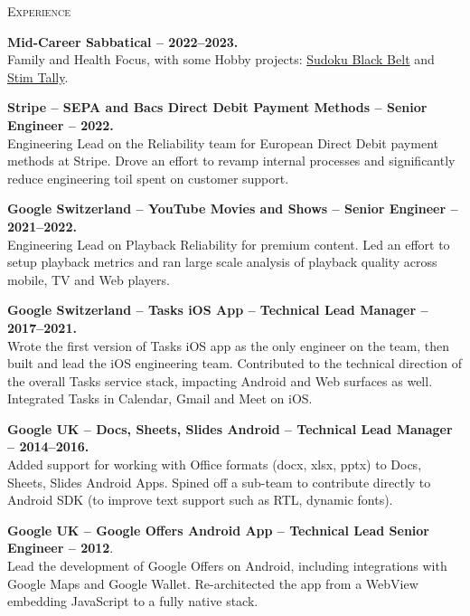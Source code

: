 \documentclass[11pt]{article}
\begin{document}
\vspace{0.12in}
\noindent
\textcolor{Primary}{{\large \textsc{Experience}}}
\begin{list}{}{\leftmargin=0em}

\item
{\bf Mid-Career Sabbatical -- 2022--2023.}\\
Family and Health Focus, with some Hobby projects: \href{https://apps.apple.com/us/app/sudoku-black-belt/id1639802667}{Sudoku Black Belt} and 
\href{https://apps.apple.com/us/app/stim-tally/id6444342899}{Stim Tally}.

\item
{\bf Stripe -- SEPA and Bacs Direct Debit Payment Methods -- Senior Engineer -- 2022.}\\
Engineering Lead on the Reliability team for European Direct Debit payment methods at Stripe.
Drove an effort to revamp internal processes and significantly reduce engineering toil spent on customer support.
  
\item
{\bf Google Switzerland -- YouTube Movies and Shows -- Senior Engineer -- 2021--2022.}\\
Engineering Lead on Playback Reliability for premium content. Led an effort to setup playback metrics and ran large scale analysis of playback quality across mobile, TV and Web players.

\item
{\bf Google Switzerland -- Tasks iOS App -- Technical Lead Manager -- 2017--2021.}\\
Wrote the first version of Tasks iOS app as the only engineer on the team, then built and lead the iOS engineering team.
Contributed to the technical direction of the overall Tasks service stack, impacting Android and Web surfaces
as well. Integrated Tasks in Calendar, Gmail and Meet on iOS.
  
\item
{\bf Google UK -- Docs, Sheets, Slides Android -- Technical Lead Manager -- 2014--2016.}\\
Added support for working with Office formats (docx, xlsx, pptx) to Docs, Sheets, Slides Android Apps. Spined off a
sub-team to contribute directly to Android SDK (to improve text support such as RTL, dynamic fonts). 

\item
{\bf Google UK -- Google Offers Android App -- Technical Lead Senior Engineer -- 2012}.\\
Lead the development of Google Offers on Android, including integrations with Google Maps and Google Wallet.
Re-architected the app from a WebView embedding JavaScript to a fully native stack.


\end{list}
\end{document}
